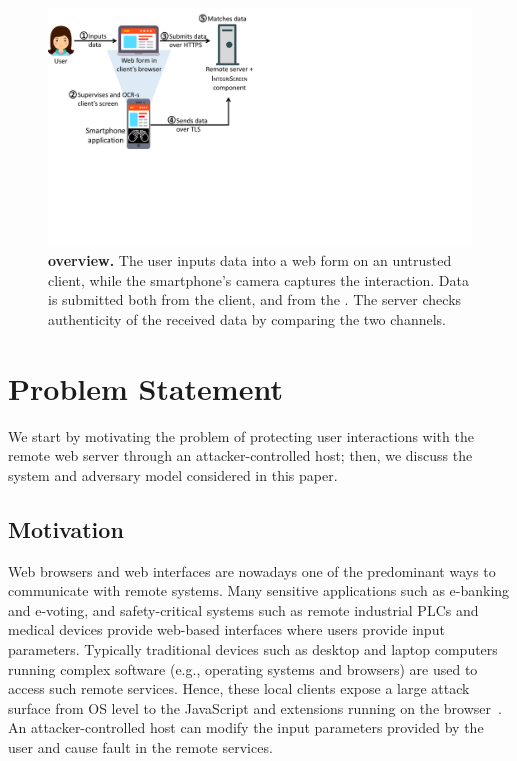 \begin{figure}[t]
	\centering
	\includegraphics[trim={0 7cm 17cm 0},clip,width=0.9\linewidth]{img/systemModel.pdf}
	\caption{\textbf{\sysname overview.}
	    \one The user inputs data into a web form on an untrusted client, \two while the smartphone's camera captures the interaction.
	    \three Data is submitted both from the client, and \four from the \app.
		\five The server checks authenticity of the received data by comparing the two channels.}
	\label{fig:systemModel}
\end{figure}



\section{Problem Statement}
\label{sec:problemStatement}


We start by motivating the problem of protecting user interactions with the remote web server through an attacker-controlled host; then, we discuss the system and adversary model considered in this paper.

\vspace{0.15cm}
\subsection{Motivation}

Web browsers and web interfaces are nowadays one of the predominant ways to communicate with remote systems.
Many sensitive applications such as e-banking and e-voting, and safety-critical systems such as remote industrial PLCs and medical devices provide web-based interfaces where users provide input parameters.
Typically traditional devices such as desktop and laptop computers running complex software (e.g., operating systems and browsers) are used to access such remote services. Hence, these local clients expose a large attack surface from OS level to the JavaScript and extensions running on the browser~\cite{driveByDownload, extensionSecurity, extensionSecurity1, extensionHack1, microsoftPatches, kernelSecurity, linuxMalware, zeusMalware, wannacry}. An attacker-controlled host can modify the input parameters provided by the user and cause fault in the remote services.

